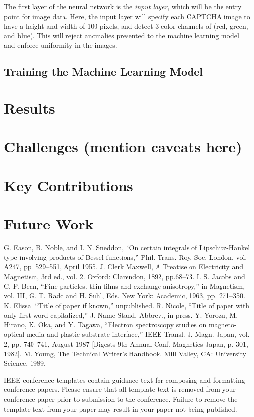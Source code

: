 \documentclass[11pt,conference]{IEEEtran}
\begin{document}
The first layer of the neural network is the \emph{input layer}, which will be
the entry point for image data. Here, the input layer will specify each CAPTCHA image
to have a height and width of 100 pixels, and detect 3 color channels of
(red, green, and blue). This will reject anomalies presented to the machine
learning model and enforce uniformity in the images.

\subsection{Training the Machine Learning Model}

\section{Results}

\section{Challenges (mention caveats here)}

\section{Key Contributions}



\section{Future Work}


\begin{thebibliography}{00}
	 G. Eason, B. Noble, and I. N. Sneddon, ``On certain integrals of Lipschitz-Hankel type involving products of Bessel functions,'' Phil. Trans. Roy. Soc. London, vol. A247, pp. 529--551, April 1955.
	 J. Clerk Maxwell, A Treatise on Electricity and Magnetism, 3rd ed., vol. 2. Oxford: Clarendon, 1892, pp.68--73.
	 I. S. Jacobs and C. P. Bean, ``Fine particles, thin films and exchange anisotropy,'' in Magnetism, vol. III, G. T. Rado and H. Suhl, Eds. New York: Academic, 1963, pp. 271--350.
	 K. Elissa, ``Title of paper if known,'' unpublished.
	 R. Nicole, ``Title of paper with only first word capitalized,'' J. Name Stand. Abbrev., in press.
	 Y. Yorozu, M. Hirano, K. Oka, and Y. Tagawa, ``Electron spectroscopy studies on magneto-optical media and plastic substrate interface,'' IEEE Transl. J. Magn. Japan, vol. 2, pp. 740--741, August 1987 [Digests 9th Annual Conf. Magnetics Japan, p. 301, 1982].
	 M. Young, The Technical Writer's Handbook. Mill Valley, CA: University Science, 1989.
\end{thebibliography}
\vspace{12pt}
\color{red}
IEEE conference templates contain guidance text for composing and formatting conference papers. Please ensure that all template text is removed from your conference paper prior to submission to the conference. Failure to remove the template text from your paper may result in your paper not being published.
\end{document}
